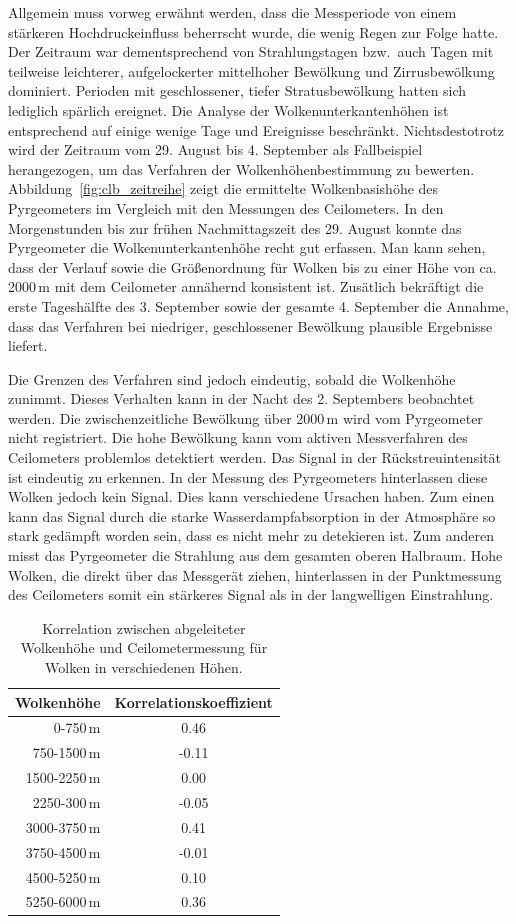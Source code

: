 \documentclass[10pt,a4paper,compsoc,peer review papers]{IEEEtran}
\begin{document}
Allgemein muss vorweg erwähnt werden, dass die Messperiode von einem stärkeren
Hochdruckeinfluss beherrscht wurde, die wenig Regen zur Folge hatte. Der
Zeitraum war dementsprechend von Strahlungstagen bzw.\ auch  Tagen mit
teilweise leichterer, aufgelockerter mittelhoher Bewölkung und Zirrusbewölkung
dominiert.  Perioden mit geschlossener, tiefer Stratusbewölkung hatten sich
lediglich spärlich ereignet. Die Analyse der Wolkenunterkantenhöhen ist
entsprechend auf einige wenige Tage und Ereignisse beschränkt.
Nichtsdestotrotz wird der Zeitraum vom 29. August bis 4. September als
Fallbeispiel herangezogen, um das Verfahren der  Wolkenhöhenbestimmung zu
bewerten. Abbildung~\ref{fig:clb_zeitreihe} zeigt die ermittelte
Wolkenbasishöhe des Pyrgeometers im Vergleich mit den Messungen des
Ceilometers.  In den Morgenstunden bis zur frühen Nachmittagszeit des 29.
August konnte das Pyrgeometer die Wolkenunterkantenhöhe recht gut erfassen. Man
kann sehen, dass der Verlauf sowie die Größenordnung für Wolken bis zu einer
Höhe von ca. 2000\,m mit dem Ceilometer annähernd konsistent ist. Zusätlich
bekräftigt die erste Tageshälfte des 3. September sowie der gesamte 4.
September die Annahme, dass das Verfahren bei niedriger, geschlossener
Bewölkung plausible Ergebnisse liefert.

Die Grenzen des Verfahren sind jedoch eindeutig, sobald die Wolkenhöhe zunimmt.
Dieses Verhalten kann in der Nacht des 2. Septembers beobachtet werden. Die
zwischenzeitliche Bewölkung über 2000\,m wird vom Pyrgeometer nicht
registriert. Die hohe Bewölkung kann vom aktiven Messverfahren des Ceilometers
problemlos detektiert werden.  Das Signal in der Rückstreuintensität ist
eindeutig zu erkennen. In der Messung des Pyrgeometers hinterlassen diese
Wolken jedoch kein Signal.  Dies kann verschiedene Ursachen haben.  Zum einen
kann das Signal durch die starke Wasserdampfabsorption in der Atmosphäre
so stark gedämpft worden sein, dass es nicht mehr zu detekieren ist.  Zum
anderen misst das Pyrgeometer die Strahlung aus dem gesamten oberen Halbraum.
Hohe Wolken, die direkt über das Messgerät ziehen, hinterlassen in der
Punktmessung des Ceilometers somit ein stärkeres Signal als in der langwelligen
Einstrahlung.

\begin{table}[ht]
  \centering
  \caption{Korrelation zwischen abgeleiteter Wolkenhöhe und Ceilometermessung
  für Wolken in verschiedenen Höhen.}
  \label{tab:korrelation}
  \begin{tabular}{r|c}
  \textbf{Wolkenhöhe} & \textbf{Korrelationskoeffizient} \\\hline
  0-750\,m     &  0.46 \\
  750-1500\,m  & -0.11 \\
  1500-2250\,m &  0.00 \\
  2250-300\,m  & -0.05 \\
  3000-3750\,m &  0.41 \\
  3750-4500\,m & -0.01 \\
  4500-5250\,m &  0.10 \\
  5250-6000\,m &  0.36 \\
  \end{tabular}
\end{table}
\end{document}
